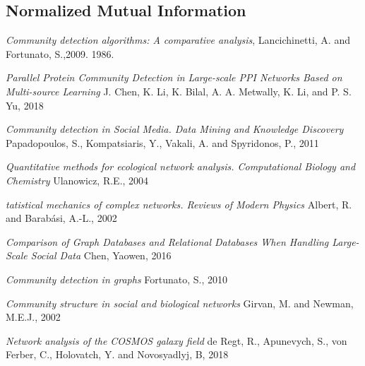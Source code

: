 \documentclass[12pt]{article}
\begin{document}

\subsection{Normalized Mutual Information}


\pagebreak
\begin{thebibliography}{100}

  
    \textit{Community detection algorithms: A comparative analysis},
    Lancichinetti, A. and Fortunato, S.,2009.
    1986.
  
    \textit{Parallel Protein Community Detection in
    Large-scale PPI Networks Based on
    Multi-source Learning}
    J. Chen, K. Li, K. Bilal, A. A. Metwally, K. Li, and P. S. Yu,
    2018
    
    \textit{Community detection in Social Media. Data Mining and Knowledge Discovery}
    Papadopoulos, S., Kompatsiaris, Y., Vakali, A. and Spyridonos, P.,
    2011
    
    \textit{Quantitative methods for ecological network analysis. Computational Biology and Chemistry}
    Ulanowicz, R.E.,
    2004
    
    \textit{tatistical mechanics of complex networks. Reviews of Modern Physics}
    Albert, R. and Barabási, A.-L.,
    2002
    
    \textit{Comparison of Graph Databases and Relational Databases When Handling Large-Scale Social Data}
    Chen, Yaowen,
    2016
    
    \textit{Community detection in graphs}
    Fortunato, S.,
    2010
    
    \textit{Community structure in social and biological networks}
    Girvan, M. and Newman, M.E.J.,
    2002
    
    \textit{Network analysis of the COSMOS galaxy field}
    de Regt, R., Apunevych, S., von Ferber, C., Holovatch, Y. and Novosyadlyj, B,
    2018
    

\end{thebibliography}
\end{document}
